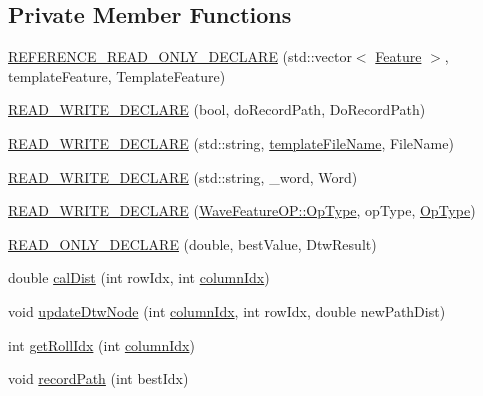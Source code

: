\subsection*{Private Member Functions}
\begin{DoxyCompactItemize}
\item 
\hyperlink{class_wave_feature_o_p_a2f106221542839a8cc7bf7289242ba73}{R\+E\+F\+E\+R\+E\+N\+C\+E\+\_\+\+R\+E\+A\+D\+\_\+\+O\+N\+L\+Y\+\_\+\+D\+E\+C\+L\+A\+R\+E} (std\+::vector$<$ \hyperlink{class_feature}{Feature} $>$, template\+Feature, Template\+Feature)
\item 
\hyperlink{class_wave_feature_o_p_a7fd393cae6541e5e5a4d341eca41e06f}{R\+E\+A\+D\+\_\+\+W\+R\+I\+T\+E\+\_\+\+D\+E\+C\+L\+A\+R\+E} (bool, do\+Record\+Path, Do\+Record\+Path)
\item 
\hyperlink{class_wave_feature_o_p_ab0a54a0e86eaa4a0c21f990f7280e6bd}{R\+E\+A\+D\+\_\+\+W\+R\+I\+T\+E\+\_\+\+D\+E\+C\+L\+A\+R\+E} (std\+::string, \hyperlink{rawdtw_8cpp_a7171b31127817befcc9fc0fb8f368a54}{template\+File\+Name}, File\+Name)
\item 
\hyperlink{class_wave_feature_o_p_a8c2271f6b26948fd6f4b8eb83ee72ed0}{R\+E\+A\+D\+\_\+\+W\+R\+I\+T\+E\+\_\+\+D\+E\+C\+L\+A\+R\+E} (std\+::string, \+\_\+word, Word)
\item 
\hyperlink{class_wave_feature_o_p_aa379ff8e29b7d67eb154ca1fd9b698f4}{R\+E\+A\+D\+\_\+\+W\+R\+I\+T\+E\+\_\+\+D\+E\+C\+L\+A\+R\+E} (\hyperlink{class_wave_feature_o_p_a9c2fd724a37768ed03dc5b011d257500}{Wave\+Feature\+O\+P\+::\+Op\+Type}, op\+Type, \hyperlink{class_wave_feature_o_p_a9c2fd724a37768ed03dc5b011d257500}{Op\+Type})
\item 
\hyperlink{class_wave_feature_o_p_a2851a010753b408b00e4077df2a8e1ce}{R\+E\+A\+D\+\_\+\+O\+N\+L\+Y\+\_\+\+D\+E\+C\+L\+A\+R\+E} (double, best\+Value, Dtw\+Result)
\item 
double \hyperlink{class_wave_feature_o_p_af586ac7dda241f1fd7def8a8a09a2181}{cal\+Dist} (int row\+Idx, int \hyperlink{class_wave_feature_o_p_a506bd025079326383412704dd93c402d}{column\+Idx})
\item 
void \hyperlink{class_wave_feature_o_p_a18142ce4be84ca4663c8ea8e208f5a02}{update\+Dtw\+Node} (int \hyperlink{class_wave_feature_o_p_a506bd025079326383412704dd93c402d}{column\+Idx}, int row\+Idx, double new\+Path\+Dist)
\item 
int \hyperlink{class_wave_feature_o_p_ac9c6eec84457d28e34b8002e364cecbc}{get\+Roll\+Idx} (int \hyperlink{class_wave_feature_o_p_a506bd025079326383412704dd93c402d}{column\+Idx})
\item 
void \hyperlink{class_wave_feature_o_p_a7568c3f771218b5e58988963a77e68da}{record\+Path} (int best\+Idx)
\end{DoxyCompactItemize}
